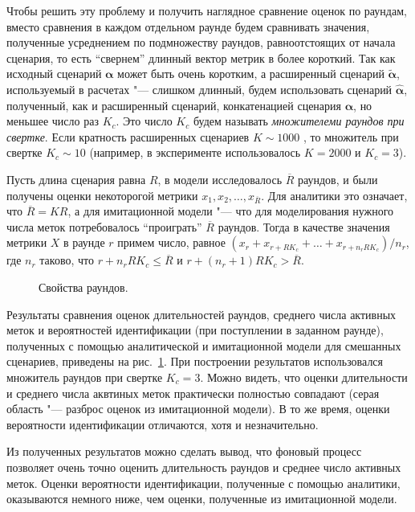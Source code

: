Чтобы решить эту проблему и получить наглядное сравнение оценок по раундам, вместо сравнения в каждом отдельном раунде будем сравнивать значения, полученные усреднением по подмножеству раундов, равноотстоящих от начала сценария, то есть ``свернем'' длинный вектор метрик в более короткий. Так как исходный сценарий $\bm{\alpha}$ может быть очень коротким, а расширенный сценарий $\widetilde{\bm{\alpha}}$, используемый в расчетах "--- слишком длинный, будем использовать сценарий $\hat{\bm{\alpha}}$, полученный, как и расширенный сценарий, конкатенацией сценария $\bm{\alpha}$, но меньшее число раз $K_c$. Это число $K_c$ будем называть \textit{множителеми раундов при свертке}. Если кратность расширенных сценариев $K \sim 1000$ , то множитель при свертке $K_c \sim 10$ (например, в эксперименте использовалось $K = 2000$ и $K_c = 3$).

Пусть длина сценария равна $R$, в модели исследовалось $\overline{R}$ раундов, и были получены оценки некоторогой метрики $x_1, x_2, \dots, x_{\overline{R}}$. Для аналитики это означает, что $\overline{R} = KR$, а для имитационной модели "--- что для моделирования нужного числа меток потребовалось ``проиграть'' $\overline{R}$ раундов. Тогда в качестве значения метрики $X$ в раунде $r$ примем число, равное $(x_r + x_{r+RK_c} + \dots + x_{r+n_r RK_c}) / n_r$, где $n_r$ таково, что $r + n_r RK_c \leqslant \overline{R}$ и $r + (n_r + 1) RK_c > \overline{R}$.

\begin{figure}[htb]
  \caption{Свойства раундов.}
  \label{fig:ch3_results_rounds_props}
\end{figure}

Результаты сравнения оценок длительностей раундов, среднего числа активных меток и вероятностей идентификации (при поступлении в заданном раунде), полученных с помощью аналитической и имитационной модели для смешанных сценариев, приведены на рис.~\ref{fig:ch3_results_rounds_props}. При построении результатов использовался множитель раундов при свертке $K_c = 3$. Можно видеть, что оценки длительности и среднего числа аквтиных меток практически полностью совпадают (серая область "--- разброс оценок из имитационной модели). В то же время, оценки вероятности идентификации отличаются, хотя и незначительно.

Из полученных результатов можно сделать вывод, что фоновый процесс позволяет очень точно оценить длительность раундов и среднее число активных меток. Оценки вероятности идентификации, полученные с помощью аналитики, оказываются немного ниже, чем оценки, полученные из имитационной модели.




